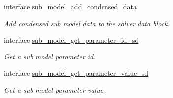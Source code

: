 \begin{DoxyCompactItemize}
interface \mbox{\hyperlink{interfacepmc__phlex__solver__data_1_1sub__model__add__condensed__data}{sub\+\_\+model\+\_\+add\+\_\+condensed\+\_\+data}}
\begin{DoxyCompactList}\small\item\em Add condensed sub model data to the solver data block. \end{DoxyCompactList}\item 
interface \mbox{\hyperlink{interfacepmc__phlex__solver__data_1_1sub__model__get__parameter__id__sd}{sub\+\_\+model\+\_\+get\+\_\+parameter\+\_\+id\+\_\+sd}}
\begin{DoxyCompactList}\small\item\em Get a sub model parameter id. \end{DoxyCompactList}\item 
interface \mbox{\hyperlink{interfacepmc__phlex__solver__data_1_1sub__model__get__parameter__value__sd}{sub\+\_\+model\+\_\+get\+\_\+parameter\+\_\+value\+\_\+sd}}
\begin{DoxyCompactList}\small\item\em Get a sub model parameter value. \end{DoxyCompactList}\end{DoxyCompactItemize}
